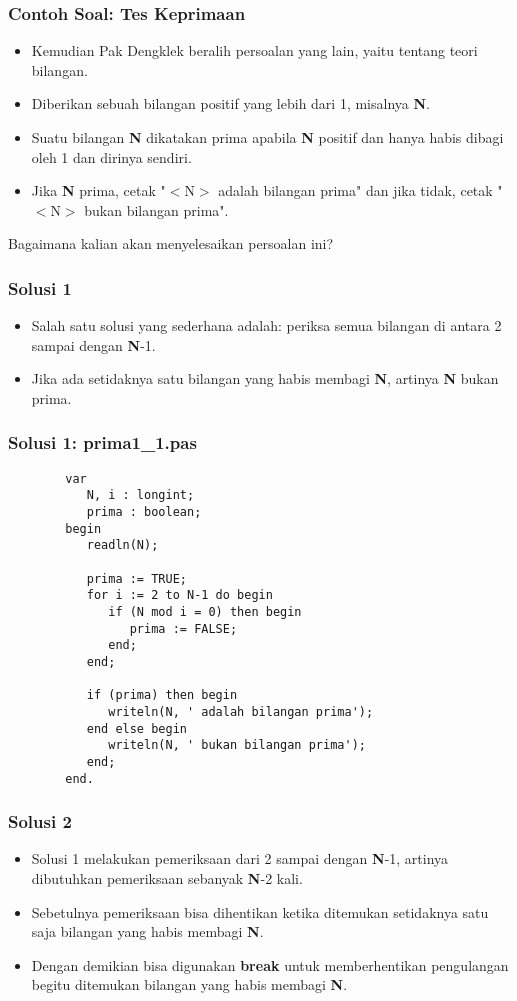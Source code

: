 \documentclass{beamer}
\begin{document}
\begin{frame}
\frametitle{Contoh Soal: Tes Keprimaan}
\begin{itemize}
	\item Kemudian Pak Dengklek beralih persoalan yang lain, yaitu tentang teori bilangan.
	\item Diberikan sebuah bilangan positif yang lebih dari 1, misalnya \textbf{N}.
	\item Suatu bilangan \textbf{N} dikatakan prima apabila \textbf{N} positif dan hanya habis dibagi oleh 1 dan dirinya sendiri.
	\item Jika \textbf{N} prima, cetak "$<$N$>$ adalah bilangan prima" dan jika tidak, cetak "$<$N$>$ bukan bilangan prima".
\end{itemize}
Bagaimana kalian akan menyelesaikan persoalan ini?
\end{frame}

\begin{frame}
\frametitle{Solusi 1}
\begin{itemize}
	\item Salah satu solusi yang sederhana adalah: periksa semua bilangan di antara 2 sampai dengan \textbf{N}-1.
	\item Jika ada setidaknya satu bilangan yang habis membagi \textbf{N}, artinya \textbf{N} bukan prima.
\end{itemize}
\end{frame}


\begin{frame}[fragile]
\frametitle{Solusi 1: prima1\_1.pas}
	\begin{lstlisting}
		var
		   N, i : longint;
		   prima : boolean;
		begin
		   readln(N);
		
		   prima := TRUE;
		   for i := 2 to N-1 do begin
		      if (N mod i = 0) then begin
		         prima := FALSE;
		      end;
		   end;
		
		   if (prima) then begin
		      writeln(N, ' adalah bilangan prima');
		   end else begin
		      writeln(N, ' bukan bilangan prima');
		   end;
		end.
	\end{lstlisting}
\end{frame}

\begin{frame}
\frametitle{Solusi 2}
\begin{itemize}
	\item Solusi 1 melakukan pemeriksaan dari 2 sampai dengan \textbf{N}-1, artinya dibutuhkan pemeriksaan sebanyak \textbf{N}-2 kali.
	\item Sebetulnya pemeriksaan bisa dihentikan ketika ditemukan setidaknya satu saja bilangan yang habis membagi \textbf{N}.
	\item Dengan demikian bisa digunakan \textbf{break} untuk memberhentikan pengulangan begitu ditemukan bilangan yang habis membagi \textbf{N}.
\end{itemize}
\end{frame}
\end{document}
